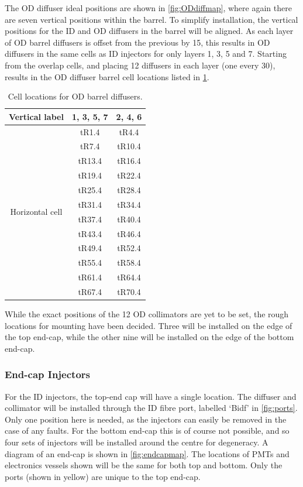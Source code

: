 \documentclass[a4paper,11pt]{article}
\begin{document}
The OD diffuser ideal positions are shown in \cref{fig:ODdiffmap}, where again there are seven vertical positions within the barrel. To simplify installation, the vertical positions for the ID and OD diffusers in the barrel will be aligned. As each layer of OD barrel diffusers is offset from the previous by 15\degree , this results in OD diffusers in the same cells as ID injectors for only layers 1, 3, 5 and 7. Starting from the overlap cells, and placing 12 diffusers in each layer (one every 30\degree), results in the OD diffuser barrel cell locations listed in \cref{tab:ODdiffBarrel}.
\begin{table}[h!]
\centering
\begin{tabular}{c|cc} \toprule
Vertical label 			& 1, 3, 5, 7 & 2, 4, 6 \\ \midrule
\multirow{12}{*}{Horizontal cell}	&	tR1.4	&	tR4.4 	\\
						&	tR7.4	&	tR10.4	\\
						&	tR13.4	&	tR16.4	\\
						&	tR19.4	&	tR22.4	\\
						&	tR25.4	&	tR28.4	\\
						&	tR31.4	&	tR34.4	\\
						&	tR37.4	&	tR40.4	\\
						&	tR43.4	&	tR46.4	\\
						&	tR49.4	&	tR52.4	\\
						&	tR55.4	&	tR58.4	\\
						&	tR61.4	&	tR64.4	\\
						&	tR67.4	&	tR70.4	\\ \bottomrule
\end{tabular}
\caption{Cell locations for OD barrel diffusers.}\label{tab:ODdiffBarrel}
\end{table}

While the exact positions of the 12 OD collimators are yet to be set, the rough locations for mounting have been decided. Three will be installed on the edge of the top end-cap, while the other nine will be installed on the edge of the bottom end-cap.

\subsubsection{End-cap Injectors}

For the ID injectors, the top-end cap will have a single location. The diffuser and collimator will be installed through the ID fibre port, labelled `Bidf' in \cref{fig:ports}. Only one position here is needed, as the injectors can easily be removed in the case of any faults. For the bottom end-cap this is of course not possible, and so four sets of injectors will be installed around the centre for degeneracy. A diagram of an end-cap is shown in \cref{fig:endcapmap}. The locations of PMTs and electronics vessels shown will be the same for both top and bottom. Only the ports (shown in yellow) are unique to the top end-cap.
\end{document}

